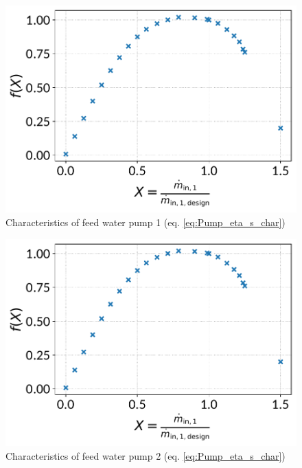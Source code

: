 \documentclass[]{article}
\begin{document}
\begin{minipage}{0.5\textwidth}
\begin{figure}[H]\begin{center}
\includegraphics[width=\textwidth]{figures/Pump_CharLine_eta_s_char_feed_water_pump_1.pdf}
\caption{Characteristics of feed water pump 1 (eq. \ref{eq:Pump_eta_s_char})}
\label{fig:CharLine_eta_s_char_feed water pump 1}
\end{center}\end{figure}

\end{minipage}
\begin{minipage}{0.5\textwidth}
\begin{figure}[H]\begin{center}
\includegraphics[width=\textwidth]{figures/Pump_CharLine_eta_s_char_feed_water_pump_2.pdf}
\caption{Characteristics of feed water pump 2 (eq. \ref{eq:Pump_eta_s_char})}
\label{fig:CharLine_eta_s_char_feed water pump 2}
\end{center}\end{figure}

\end{minipage}
\end{document}
